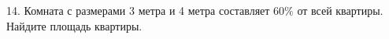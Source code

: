 14. Комната с размерами 3 метра и 4 метра составляет $60\%$ от всей квартиры. Найдите площадь квартиры.\\
